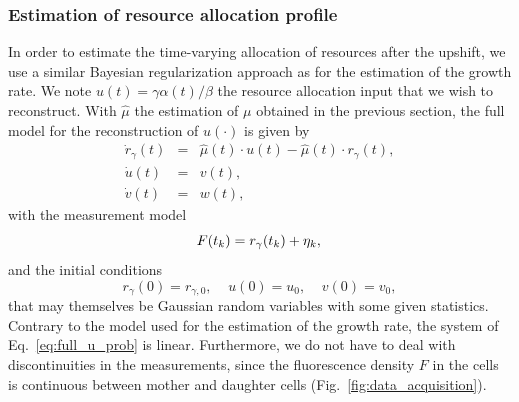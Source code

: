 \subsubsection*{Estimation of resource allocation profile}

In order to estimate the time-varying allocation of resources after the upshift, we use a similar Bayesian regularization approach as for the estimation of the growth rate.
We note $u(t) = \gamma \alpha (t) / \beta$ the resource allocation input that we wish to reconstruct.
With $\hat{\mu}$ the estimation of $\mu$ obtained in the previous section, the full model for the reconstruction of $u (\cdot)$ is given by
\begin{eqnarray}
\dot{r}_\gamma(t) &=& \hat{\mu} (t) \cdot u (t) - \hat{\mu} (t) \cdot r_\gamma (t), \nonumber\\
\dot{u}(t) &=& v(t),\label{eq:full_u_prob}\\
\dot{v}(t) &=& w(t),\nonumber
\end{eqnarray}
with the measurement model
\begin{equation}
F(t_k) = r_\gamma (t_k) + \eta_k,\\
\end{equation}
and the initial conditions
\[
r_\gamma (0) = r_{\gamma,0}, \;\;\;\; u (0) = u_0 , \;\;\;\; v(0) = v_0,
\]
that may themselves be Gaussian random variables with some given statistics.
Contrary to the model used for the estimation of the growth rate, the system of Eq.~\ref{eq:full_u_prob} is linear.
Furthermore, we do not have to deal with discontinuities in the measurements, since the fluorescence density $F$ in the cells is continuous between mother and daughter cells (Fig.~\ref{fig:data_acquisition}).

